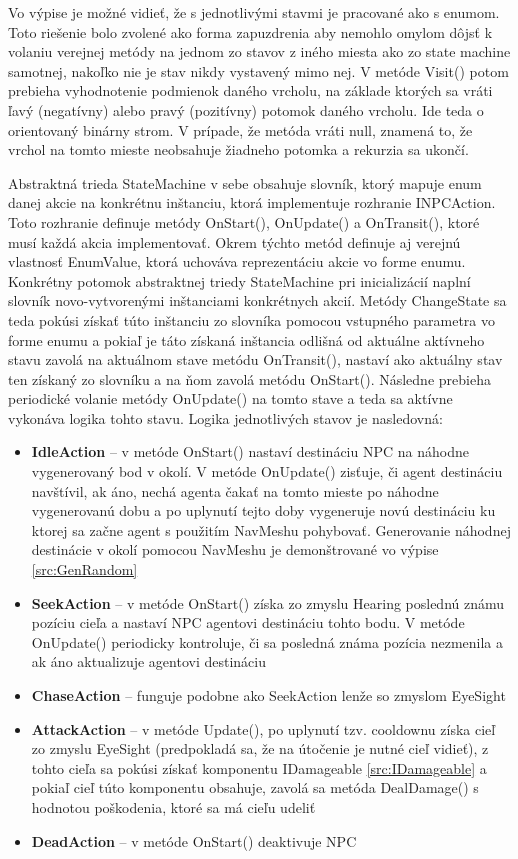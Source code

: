 \documentclass[slovak, master]{diploma}
\begin{document}
Vo výpise je možné vidieť, že s jednotlivými stavmi je pracované ako s enumom. Toto riešenie bolo zvolené ako forma zapuzdrenia aby nemohlo omylom dôjsť k volaniu verejnej metódy na jednom zo stavov z iného miesta ako zo state machine samotnej, nakoľko nie je stav nikdy vystavený mimo nej. V metóde Visit() potom prebieha vyhodnotenie podmienok daného vrcholu, na základe ktorých sa vráti ľavý (negatívny) alebo pravý (pozitívny) potomok daného vrcholu. Ide teda o orientovaný binárny strom. V prípade, že metóda vráti null, znamená to, že vrchol na tomto mieste neobsahuje žiadneho potomka a rekurzia sa ukončí.

Abstraktná trieda StateMachine v sebe obsahuje slovník, ktorý mapuje enum danej akcie na konkrétnu inštanciu, ktorá implementuje rozhranie INPCAction. Toto rozhranie definuje metódy OnStart(), OnUpdate() a OnTransit(), ktoré musí každá akcia implementovať. Okrem týchto metód definuje aj verejnú vlastnosť EnumValue, ktorá uchováva reprezentáciu akcie vo forme enumu. Konkrétny potomok abstraktnej triedy StateMachine pri inicializácií naplní slovník novo-vytvorenými inštanciami konkrétnych akcií. Metódy ChangeState sa teda pokúsi získať túto inštanciu zo slovníka pomocou vstupného parametra vo forme enumu a pokiaľ je táto získaná inštancia odlišná od aktuálne aktívneho stavu zavolá na aktuálnom stave metódu OnTransit(), nastaví ako aktuálny stav ten získaný zo slovníku a na ňom zavolá metódu OnStart(). Následne prebieha periodické volanie metódy OnUpdate() na tomto stave a teda sa aktívne vykonáva logika tohto stavu. Logika jednotlivých stavov je nasledovná:
\begin{itemize}
  \item \textbf{IdleAction} -- v metóde OnStart() nastaví destináciu NPC na náhodne vygenerovaný bod v okolí. V metóde OnUpdate() zisťuje, či agent destináciu navštívil, ak áno, nechá agenta čakať na tomto mieste po náhodne vygenerovanú dobu a po uplynutí tejto doby vygeneruje novú destináciu ku ktorej sa začne agent s použitím NavMeshu pohybovať. Generovanie náhodnej destinácie v okolí pomocou NavMeshu je demonštrované vo výpise \ref{src:GenRandom}
  \item \textbf{SeekAction} -- v metóde OnStart() získa zo zmyslu Hearing poslednú známu pozíciu cieľa a nastaví NPC agentovi destináciu tohto bodu. V metóde OnUpdate() periodicky kontroluje, či sa posledná známa pozícia nezmenila a ak áno aktualizuje agentovi destináciu
  \item \textbf{ChaseAction} -- funguje podobne ako SeekAction lenže so zmyslom EyeSight
  \item \textbf{AttackAction} -- v metóde Update(), po uplynutí tzv. cooldownu získa cieľ zo zmyslu EyeSight (predpokladá sa, že na útočenie je nutné cieľ vidieť), z tohto cieľa sa pokúsi získať komponentu IDamageable \ref{src:IDamageable} a pokiaľ cieľ túto komponentu obsahuje, zavolá sa metóda DealDamage() s hodnotou poškodenia, ktoré sa má cieľu udeliť
  \item \textbf{DeadAction} -- v metóde OnStart() deaktivuje NPC
\end{itemize}
\end{document}

